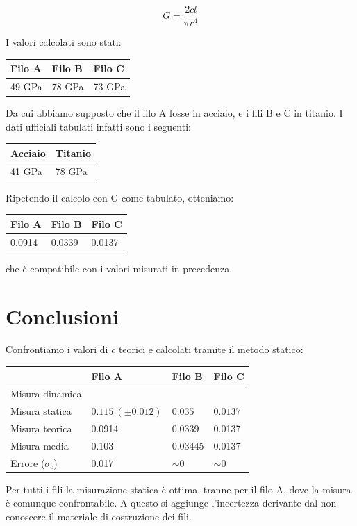$$ G = \frac{2cl}{\pi r^4} $$

I valori calcolati sono stati:
\begin{center}
\begin{tabular}{lll}
Filo A & Filo B & Filo C \\
\midrule
49 GPa & 78 GPa & 73 GPa \\
\end{tabular}
\end{center}

Da cui abbiamo supposto che il filo A fosse in acciaio, e i fili B e C in titanio.
I dati ufficiali tabulati infatti sono i seguenti:
\begin{center}
\begin{tabular}{ll}
Acciaio & Titanio \\
\midrule
41 GPa & 78 GPa \\
\end{tabular}
\end{center}
Ripetendo il calcolo con G come tabulato, otteniamo:
\begin{center}
\begin{tabular}{lll}
Filo A & Filo B & Filo C \\
\midrule
0.0914 & 0.0339 & 0.0137 \\
\end{tabular}
\end{center}

che è compatibile con i valori misurati in precedenza.

\section{Conclusioni}
Confrontiamo i valori di $c$ teorici e calcolati tramite il metodo statico:
\begin{center}
\begin{tabular}{l|lll}
& Filo A & Filo B & Filo C \\
\midrule
Misura dinamica &  \\
Misura statica & $0.115\ (\pm 0.012)$ & $0.035$& $0.0137$ \\
Misura teorica & 0.0914 & 0.0339 & 0.0137 \\
\midrule
Misura media & 0.103 & 0.03445 & 0.0137\\
Errore ($\sigma_c$) & 0.017 & $\sim 0$ & $\sim 0$\\
\end{tabular}
\end{center}

Per tutti i fili la misurazione statica è ottima, tranne per il filo A, dove la misura è comunque confrontabile. A questo si aggiunge l'incertezza derivante dal non conoscere il materiale di costruzione dei fili.
